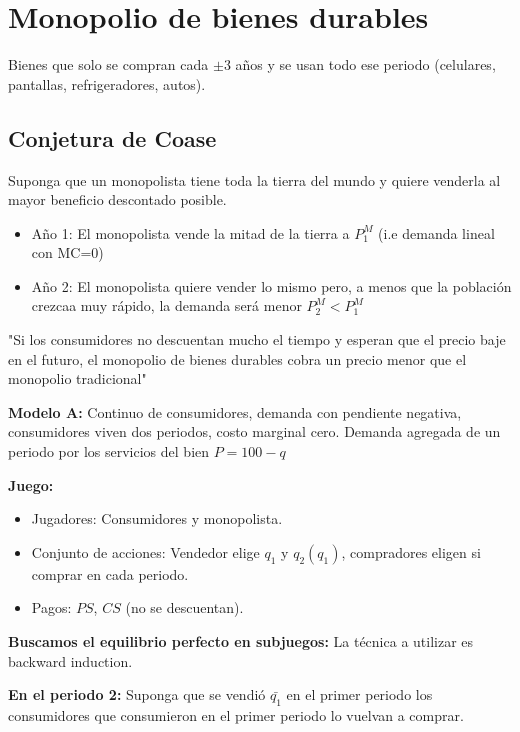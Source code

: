 \documentclass[letterpaper,12pt,twocolumn]{report}
\begin{document}
\section*{Monopolio de bienes durables}

Bienes que solo se compran cada $\pm3$ años y se usan todo ese periodo (celulares, pantallas, refrigeradores, autos).

\subsection*{Conjetura de Coase}

Suponga que un monopolista tiene toda la tierra del mundo y quiere venderla al mayor beneficio descontado posible.

\begin{itemize}
	\item Año 1: El monopolista vende la mitad de la tierra a $P^M_1$ (i.e demanda lineal con MC=0)
	\item Año 2: El monopolista quiere vender lo mismo pero, a menos que la población crezcaa muy rápido, la demanda será menor $P^M_2<P^M_1$
\end{itemize}

\begin{tcolorbox}
	"Si los consumidores no descuentan mucho el tiempo y esperan que el precio baje en el futuro, el monopolio de bienes durables cobra un precio menor que el monopolio tradicional"
\end{tcolorbox}

\textbf{Modelo A:} Continuo de consumidores, demanda con pendiente negativa, consumidores viven dos periodos, costo marginal cero. Demanda agregada de un periodo por los servicios del bien $P=100-q$

\textbf{Juego:}

\begin{itemize}
	\item Jugadores: Consumidores y monopolista.
	\item Conjunto de acciones: Vendedor elige $q_1$ y $q_2(q_1)$, compradores eligen si comprar en cada periodo.
	\item Pagos: $PS$, $CS$ (no se descuentan).
\end{itemize}

\textbf{Buscamos el equilibrio perfecto en subjuegos:} La técnica a utilizar es backward induction. 

\textbf{En el periodo 2:} Suponga que se vendió $\bar{q_1}$ en el primer periodo los consumidores que consumieron en el primer periodo lo vuelvan a comprar.
\end{document}
